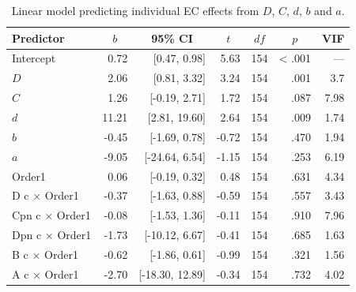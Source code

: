\documentclass[
  man,floatsintext]{apa6}
\begin{document}
\begin{table}[tbp]

\begin{center}
\begin{threeparttable}

\caption{\label{tab:unnamed-chunk-24}Linear model predicting individual EC effects from $D$, $C$, $d$, $b$ and $a$.}

\begin{tabular}{lrrrrrr}
\toprule
Predictor & \multicolumn{1}{c}{$b$} & \multicolumn{1}{c}{95\% CI} & \multicolumn{1}{c}{$t$} & \multicolumn{1}{c}{$\mathit{df}$} & \multicolumn{1}{c}{$p$} & \multicolumn{1}{c}{VIF}\\
\midrule
Intercept & 0.72 & {}[0.47, 0.98] & 5.63 & 154 & < .001 & ---\\
$D$ & 2.06 & {}[0.81, 3.32] & 3.24 & 154 & .001 & 3.7\\
$C$ & 1.26 & {}[-0.19, 2.71] & 1.72 & 154 & .087 & 7.98\\
$d$ & 11.21 & {}[2.81, 19.60] & 2.64 & 154 & .009 & 1.74\\
$b$ & -0.45 & {}[-1.69, 0.78] & -0.72 & 154 & .470 & 1.94\\
$a$ & -9.05 & {}[-24.64, 6.54] & -1.15 & 154 & .253 & 6.19\\
Order1 & 0.06 & {}[-0.19, 0.32] & 0.48 & 154 & .631 & 4.34\\
D c $\times$ Order1 & -0.37 & {}[-1.63, 0.88] & -0.59 & 154 & .557 & 3.43\\
Cpn c $\times$ Order1 & -0.08 & {}[-1.53, 1.36] & -0.11 & 154 & .910 & 7.96\\
Dpn c $\times$ Order1 & -1.73 & {}[-10.12, 6.67] & -0.41 & 154 & .685 & 1.63\\
B c $\times$ Order1 & -0.62 & {}[-1.86, 0.61] & -0.99 & 154 & .321 & 1.56\\
A c $\times$ Order1 & -2.70 & {}[-18.30, 12.89] & -0.34 & 154 & .732 & 4.02\\
\bottomrule
\end{tabular}

\end{threeparttable}
\end{center}

\end{table}
\end{document}
